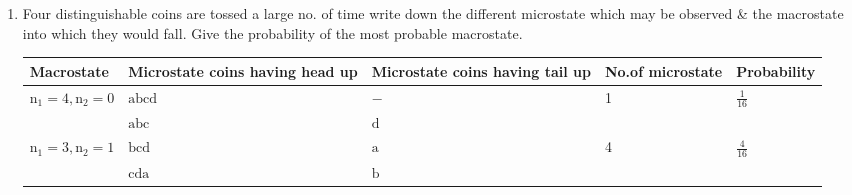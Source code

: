 \begin{enumerate}
	\begin{answer}
		\begin{align*}
		\text{Total No. of particle }&=N\\
		\text{No: of microstate for state}-1&={{N_C}_{n1}}\\
	\text{	No. of microstate for state }-2&=\mathrm{N}-\mathrm{n}_{1}{ }_{\mathrm{C}_{\mathrm{n}} 2}\\
\text{	No. of microstate for state }i^{\text {th }}&=N-n_{1}-n_{2} \ldots . n_{i}-1_{c_{n_{i}}}
\intertext{So\quad total number of microstate is}
\mathrm{N}_{\mathrm{C}_{\mathrm{n}_{1}}} \times \mathrm{N}-\mathrm{n}_{1} \mathrm{C}_{\mathrm{n}_{2}} &\times \mathrm{N}-\mathrm{n}_{1}-\mathrm{n}_{2} \mathrm{C}_{\mathrm{n}_{3}} \times \ldots \ldots \ldots \mathrm{N}-\mathrm{n}_{1}-\mathrm{n}_{2}-\mathrm{n}_{3}-\mathrm{ni}-1_{\mathrm{n}_{\mathrm{i}}}\\
=\frac{N !}{n_{1} !\left(N-n_{1}\right) !} &\times \frac{(N-n) !}{n_{2} !\left(N-n_{1}-n_{2}\right) !} \times \ldots \ldots \cdot \frac{\left(N-n_{1}-n_{2} \ldots n_{i}\right) !}{n_{i} !\left(N-n_{1}-n_{2} \ldots n_{i}\right) !}\\
=\frac{N !}{n_{i} !\left(N-n_{1}-n_{2} \ldots . n_{i}\right) !}&
-\text{ For distinguishable particle}\\
=\frac{1}{n_{i} !\left(N-n_{1}-n_{2} \ldots n_{i} !\right) !}& \rightarrow
\text{For indistinguishable particle}
		\end{align*}
	\end{answer}
	\item Four distinguishable coins are tossed a large no. of time write down the different microstate which may be observed \& the macrostate into which they would fall. Give the probability of the most probable macrostate.\\
	\begin{center}
	\begin{tabular}{|p{2.5cm}|p{2.7cm}|p{2.5cm}|p{2.7cm}|p{2.5cm}|}
		\hline Macrostate & Microstate coins having head up & Microstate coins having tail up & No.of microstate & Probability \\
		\hline $\mathrm{n}_{1}=4, \mathrm{n}_{2}=0$ & $\mathrm{a} \mathrm{b} \mathrm{c} \mathrm{d}$ & $-$ & 1 & $\frac{1}{16}$ \\
		\hline & $\mathrm{abc}$ & $\mathrm{d}$ & & \\
		$\mathrm{n}_{1}=3, \mathrm{n}_{2}=1$ & $\mathrm{bcd}$ & $\mathrm{a}$ & 4 & $\frac{4}{16}$ \\
		& $\mathrm{cda}$ & $\mathrm{b}$ & & \\

\end{tabular}
\end{center}
\end{enumerate}
